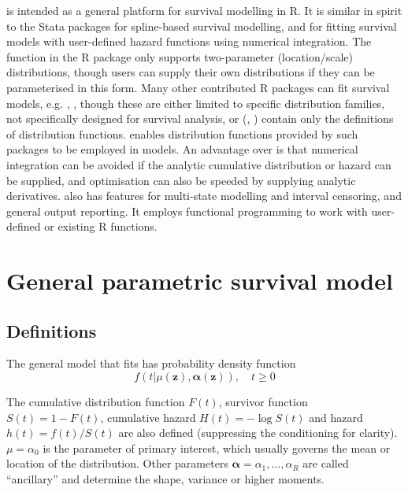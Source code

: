 \documentclass[nojss,nofooter]{jss}
\begin{document}
 is intended as a general platform for survival
modelling in R.  It is similar in spirit to the Stata packages
 \citep{stpm2} for spline-based survival modelling, and
 \citep{stgenreg} for fitting survival models with
user-defined hazard functions using numerical integration. The
 function in the R package 
\citep{therneau:survival} only supports two-parameter (location/scale)
distributions, though users can supply their own distributions if they
can be parameterised in this form.  Many other contributed R packages
can fit survival models, e.g.  \citep{eha}, 
\citep{yee:wild}, though these are either limited to specific
distribution families, not specifically designed for survival analysis,
or (, \citet{actudistns}) contain only the definitions
of distribution functions.   enables distribution
functions provided by such packages to be employed in models.  An
advantage over  is that numerical integration can be
avoided if the analytic cumulative distribution or hazard can be
supplied, and optimisation can also be speeded by supplying analytic
derivatives.   also has features for multi-state
modelling and interval censoring, and general output reporting.  It
employs functional programming to work with user-defined or existing R
functions.



\section{General parametric survival model}

\subsection{Definitions} 

The general model that  fits has probability density function
\begin{equation}
  \label{eq:model}
  f(t | \mu(\mathbf{z}), \bm{\alpha}(\mathbf{z})), \quad t \geq 0  
\end{equation}

The cumulative distribution function $F(t)$, survivor
function $S(t) = 1 - F(t)$, cumulative hazard $H(t) = -\log S(t)$ and
hazard $h(t) = f(t)/S(t)$ are also defined (suppressing the conditioning for clarity).
$\mu=\alpha_0$ is the parameter of primary interest,
which usually governs the mean or location of the distribution.  Other
parameters $\bm{\alpha} = \alpha_1, \ldots, \alpha_R$ are called
``ancillary'' and determine the shape, variance or higher moments.
\end{document}
